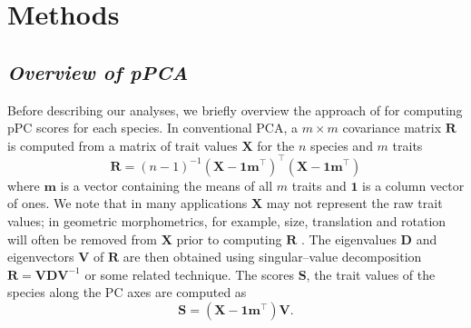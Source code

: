 \documentclass[a4paper,12pt]{article}
\begin{document}
\section{Methods}
\subsection{\emph{Overview of pPCA}}
Before describing our analyses, we briefly overview the approach of \citet{Revell2008} for computing pPC scores for each species. In conventional PCA, a $m \times m$ covariance matrix $\mathbf{R}$ is computed from a matrix of trait values $\mathbf{X}$ for the $n$ species and $m$ traits
\begin{equation}\label{eq:rpca}
\mathbf{R} = (n-1)^{-1}(\mathbf{X} - \mathbf{1m}^\intercal)^\intercal (\mathbf{X} - \mathbf{1m}^\intercal)
\end{equation}
where $\mathbf{m}$ is a vector containing the means of all $m$ traits and $\mathbf{1}$ is a column vector of ones. We note that in many applications $\mathbf{X}$ may not represent the raw trait values; in geometric morphometrics, for example, size, translation and rotation will often be removed from $\mathbf{X}$ prior to computing $\mathbf{R}$ \citep{RohlfSlice, Bookstein1997}. The eigenvalues $\mathbf{D}$ and eigenvectors $\mathbf{V}$ of $\mathbf{R}$ are then obtained using singular--value decomposition $\mathbf{R}=\mathbf{V}\mathbf{D}\mathbf{V}^{-1}$ or some related technique. The scores $\mathbf{S}$, the trait values of the species along the PC axes are computed as
\begin{equation}\label{eq:Spca}
\mathbf{S}=(\mathbf{X} - \mathbf{1m}^\intercal)\mathbf{V}.
\end{equation}
\end{document}
